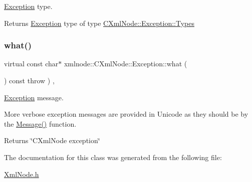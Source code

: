\mbox{\hyperlink{classxmlnode_1_1_c_xml_node_1_1_exception}{Exception}} type. 

\begin{DoxyReturn}{Returns}
\mbox{\hyperlink{classxmlnode_1_1_c_xml_node_1_1_exception}{Exception}} type of type \mbox{\hyperlink{classxmlnode_1_1_c_xml_node_1_1_exception_abdbe07531ef4b19192f1fa2f819ed75f}{C\+Xml\+Node\+::\+Exception\+::\+Types}} 
\end{DoxyReturn}
\mbox{\label{classxmlnode_1_1_c_xml_node_1_1_exception_a55ec16b50448dfa3be05f50051e5ea85}} 
\subsubsection{\texorpdfstring{what()}{what()}}
{\footnotesize\ttfamily virtual const char$\ast$ xmlnode\+::\+C\+Xml\+Node\+::\+Exception\+::what (\begin{DoxyParamCaption}{ }\end{DoxyParamCaption}) const throw  ) \hspace{0.3cm}{\ttfamily [inline]}, {\ttfamily [virtual]}}



\mbox{\hyperlink{classxmlnode_1_1_c_xml_node_1_1_exception}{Exception}} message. 

More verbose exception messages are provided in Unicode as they should be by the \mbox{\hyperlink{classxmlnode_1_1_c_xml_node_1_1_exception_a29271ad0ec50958663200f60aaae97b2}{Message()}} function. \begin{DoxyReturn}{Returns}
\char`\"{}\+C\+Xml\+Node exception\char`\"{} 
\end{DoxyReturn}


The documentation for this class was generated from the following file\+:\begin{DoxyCompactItemize}
\item 
\mbox{\hyperlink{_xml_node_8h}{Xml\+Node.\+h}}\end{DoxyCompactItemize}
